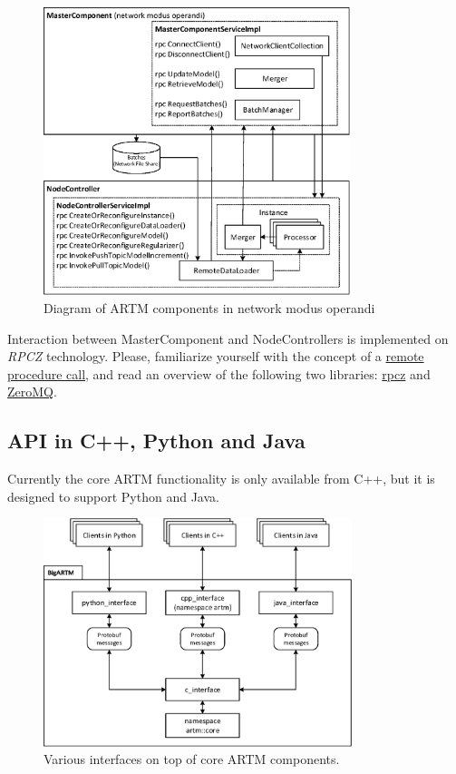 \documentclass[11pt,a4paper,twoside]{report}
\begin{document}
\begin{figure}[h!]
\begin{centering}
\includegraphics[height=84mm]{diagramm_artm_network.eps}
\caption{Diagram of ARTM components in network modus operandi}
\label{fig:diagramm_artm_network}
\end{centering}
\end{figure}
\vspace{1ex}

Interaction between MasterComponent and NodeControllers is implemented on \emph{RPCZ} technology.
Please, familiarize yourself with the concept of a
\href{en.wikipedia.org/wiki/Remote_procedure_call}{remote procedure call},
and read an overview of the following two libraries:
\href{code.google.com/p/rpcz/}{rpcz} and \href{http://zeromq.org}{ZeroMQ}.

\subsection{API in C++, Python and Java}
Currently the core ARTM functionality is only available from C++,
but it is designed to support Python and Java.

\begin{figure}[h!]
\begin{centering}
\includegraphics[width=90mm]{diagramm_BigARTM.eps}
\caption{Various interfaces on top of core ARTM components.}
\label{fig:diagramm_BigARTM}
\end{centering}
\end{figure}
\end{document}
